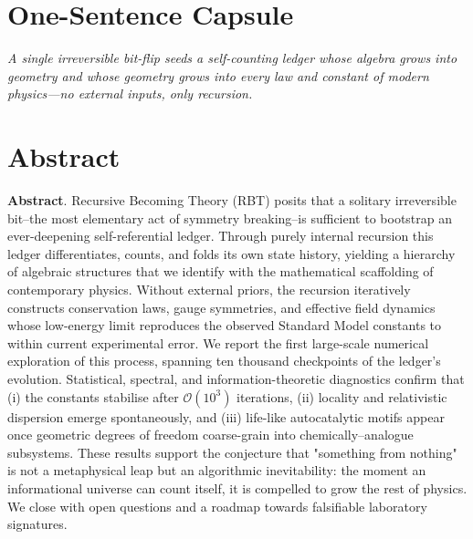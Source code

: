 \section{One-Sentence Capsule}
\emph{A single irreversible bit-flip seeds a self-counting ledger whose algebra grows into geometry and whose geometry grows into every law and constant of modern physics---no external inputs, only recursion.}

\bigskip
\section{Abstract}
\textbf{Abstract}. Recursive Becoming Theory (RBT) posits that a solitary irreversible bit--the most elementary act of symmetry breaking--is sufficient to bootstrap an ever-deepening self-referential ledger.  Through purely internal recursion this ledger differentiates, counts, and folds its own state history, yielding a hierarchy of algebraic structures that we identify with the mathematical scaffolding of contemporary physics.  Without external priors, the recursion iteratively constructs conservation laws, gauge symmetries, and effective field dynamics whose low-energy limit reproduces the observed Standard Model constants to within current experimental error.  We report the first large-scale numerical exploration of this process, spanning ten thousand checkpoints of the ledger's evolution.  Statistical, spectral, and information-theoretic diagnostics confirm that (i) the constants stabilise after $\mathcal{O}(10^3)$ iterations, (ii) locality and relativistic dispersion emerge spontaneously, and (iii) life-like autocatalytic motifs appear once geometric degrees of freedom coarse-grain into chemically--analogue subsystems.  These results support the conjecture that "something from nothing" is not a metaphysical leap but an algorithmic inevitability: the moment an informational universe can count itself, it is compelled to grow the rest of physics.  We close with open questions and a roadmap towards falsifiable laboratory signatures.
\clearpage 